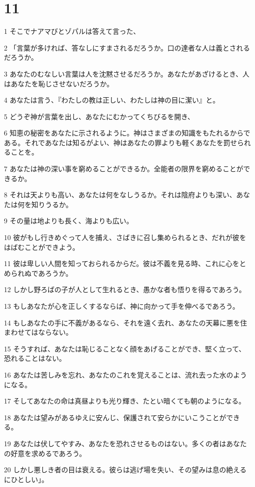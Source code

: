 \chapter{11}

\par 1 そこでナアマびとゾパルは答えて言った、
\par 2 「言葉が多ければ、答なしにすまされるだろうか。口の達者な人は義とされるだろうか。
\par 3 あなたのむなしい言葉は人を沈黙させるだろうか。あなたがあざけるとき、人はあなたを恥じさせないだろうか。
\par 4 あなたは言う、『わたしの教は正しい、わたしは神の目に潔い』と。
\par 5 どうぞ神が言葉を出し、あなたにむかってくちびるを開き、
\par 6 知恵の秘密をあなたに示されるように。神はさまざまの知識をもたれるからである。それであなたは知るがよい、神はあなたの罪よりも軽くあなたを罰せられることを。
\par 7 あなたは神の深い事を窮めることができるか。全能者の限界を窮めることができるか。
\par 8 それは天よりも高い、あなたは何をなしうるか。それは陰府よりも深い、あなたは何を知りうるか。
\par 9 その量は地よりも長く、海よりも広い。
\par 10 彼がもし行きめぐって人を捕え、さばきに召し集められるとき、だれが彼をはばむことができよう。
\par 11 彼は卑しい人間を知っておられるからだ。彼は不義を見る時、これに心をとめられぬであろうか。
\par 12 しかし野ろばの子が人として生れるとき、愚かな者も悟りを得るであろう。
\par 13 もしあなたが心を正しくするならば、神に向かって手を伸べるであろう。
\par 14 もしあなたの手に不義があるなら、それを遠く去れ、あなたの天幕に悪を住まわせてはならない。
\par 15 そうすれば、あなたは恥じることなく顔をあげることができ、堅く立って、恐れることはない。
\par 16 あなたは苦しみを忘れ、あなたのこれを覚えることは、流れ去った水のようになる。
\par 17 そしてあなたの命は真昼よりも光り輝き、たとい暗くても朝のようになる。
\par 18 あなたは望みがあるゆえに安んじ、保護されて安らかにいこうことができる。
\par 19 あなたは伏してやすみ、あなたを恐れさせるものはない。多くの者はあなたの好意を求めるであろう。
\par 20 しかし悪しき者の目は衰える。彼らは逃げ場を失い、その望みは息の絶えるにひとしい」。


